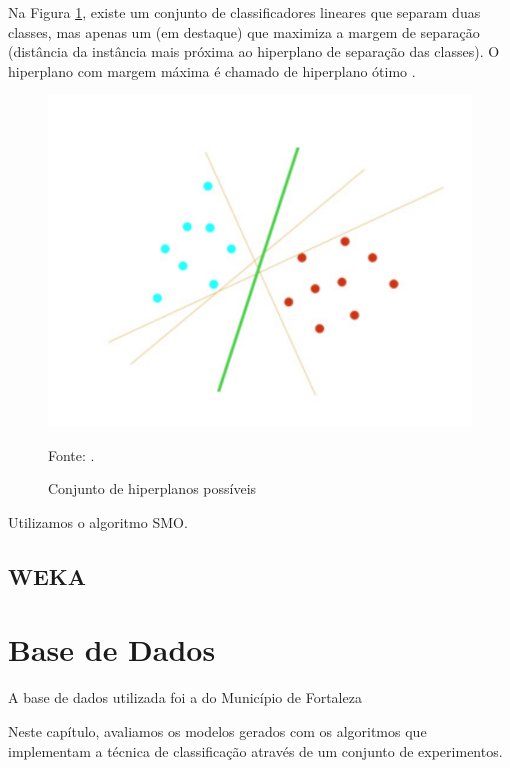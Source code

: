 \documentclass[
	12pt,				%
	openright,			%
	oneside,	
	a4paper,				%
	english,				%
	brazil				%
]{abntex2/abntex2} %
\begin{document}
	Na Figura \ref{figsvmHiperPlanos}, existe um conjunto de classificadores lineares que separam duas classes, mas apenas um (em destaque) que maximiza a margem de separação (distância da instância mais próxima ao hiperplano de separação das classes). O hiperplano com margem máxima é chamado de hiperplano ótimo \cite{junior:2010}.
	\\
	\begin{figure}[!htb]
		\caption{\label{figsvmHiperPlanos} Conjunto de hiperplanos possíveis}
		\begin{center}
			\includegraphics[scale=0.5]{img/svmHiperPlanos.png}
		\end{center}
		Fonte: \cite{junior:2010}.
	\end{figure}
	
	Utilizamos o algoritmo SMO.


	\section{WEKA}
\chapter{Base de Dados}

	A base de dados utilizada foi a do Município de Fortaleza
	
	Neste capítulo, avaliamos os modelos gerados com os algoritmos que implementam a técnica de classificação através de um conjunto de experimentos.
\end{document}
